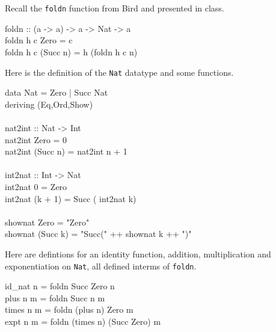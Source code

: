 \documentclass[11pt]{article}
\begin{document}

\section{}

\goodbreak\noindent{}Recall the {\tt{foldn}} function from Bird and presented in class.
\begin{program*}
\> foldn :: (a -> a) -> a -> Nat -> a \\
\> foldn h c Zero = c \\
\> foldn h c (Succ n) = h (foldn h c n) 
\end{program*}
Here is the definition of the {\tt{Nat}} datatype and  some functions.
\begin{program*}
\> data Nat = Zero | Succ Nat \\
\>    deriving (Eq,Ord,Show) \\
\>  \\
\> nat2int :: Nat -> Int \\
\> nat2int Zero = 0 \\
\> nat2int (Succ n) = nat2int n + 1 \\
\>   \\
\> int2nat :: Int -> Nat \\
\> int2nat 0 = Zero \\
\> int2nat (k + 1) = Succ ( int2nat k) \\
\>  \\
\> shownat Zero = "Zero" \\
\> shownat (Succ k) = "Succ(" ++ shownat k ++ ")"
\end{program*}
Here are defintions for an identity function, addition, multiplication
and exponentiation on {\tt{Nat}}, all defined interms of {\tt{foldn}}.

\begin{program*}
\> id\_nat n = foldn Succ Zero n \\
\> plus n m = foldn Succ n m \\
\> times n m = foldn (plus n) Zero m \\
\> expt n m = foldn (times n) (Succ Zero) m \\
\end{program*}
\end{document}
